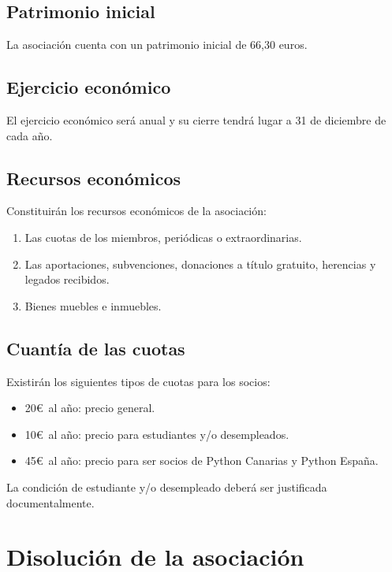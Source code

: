 \documentclass[a4paper, 12pt, oneside]{book}
\begin{document}
\section{Patrimonio inicial}

La asociación cuenta con un patrimonio inicial de 66,30 euros.

\section{Ejercicio económico}

El ejercicio económico será anual y su cierre tendrá lugar a 31 de diciembre de cada año.

\section{Recursos económicos}

Constituirán los recursos económicos de la asociación:

\begin{enumerate}
    \item Las cuotas de los miembros, periódicas o extraordinarias.  
    \item Las aportaciones, subvenciones, donaciones a título gratuito, herencias y legados recibidos.  
    \item Bienes muebles e inmuebles.
\end{enumerate}

\section{Cuantía de las cuotas}

Existirán los siguientes tipos de cuotas para los socios:

\begin{itemize}
    \item 20\euro\ al año: precio general.
    \item 10\euro\ al año: precio para estudiantes y/o desempleados.
    \item 45\euro\ al año: precio para ser socios de Python Canarias y Python España.
\end{itemize}

La condición de estudiante y/o desempleado deberá ser justificada documentalmente.

\chapter{Disolución de la asociación}
\end{document}
